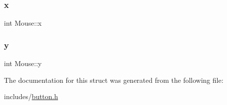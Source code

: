 \subsubsection{\texorpdfstring{x}{x}}
{\footnotesize\ttfamily int Mouse\+::x}

\mbox{\label{structMouse_a4a29b1c18faaa2fbe39ff985ba9d6737}} 
\subsubsection{\texorpdfstring{y}{y}}
{\footnotesize\ttfamily int Mouse\+::y}



The documentation for this struct was generated from the following file\+:\begin{DoxyCompactItemize}
\item 
includes/\hyperlink{button_8h}{button.\+h}\end{DoxyCompactItemize}
